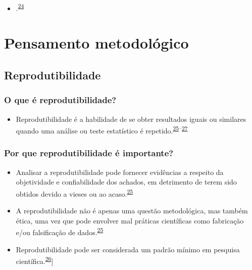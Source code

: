 \documentclass[
  a4paper,
]{book}
\providecommand{\tightlist}{%
  \setlength{\itemsep}{0pt}\setlength{\parskip}{0pt}}
\begin{document}
\begin{itemize}
\tightlist
\item
  .\textsuperscript{\protect\hyperlink{ref-feld1991}{24}}
\end{itemize}

\hypertarget{pensamento-metodologico}{%
\chapter{\texorpdfstring{\textbf{Pensamento metodológico}}{Pensamento metodológico}}\label{pensamento-metodologico}}

\hypertarget{reprodutibilidade}{%
\section{Reprodutibilidade}\label{reprodutibilidade}}

\hypertarget{o-que-uxe9-reprodutibilidade}{%
\subsection{O que é reprodutibilidade?}\label{o-que-uxe9-reprodutibilidade}}

\begin{itemize}
\tightlist
\item
  Reprodutibilidade é a habilidade de se obter resultados iguais ou similares quando uma análise ou teste estatístico é repetido.\textsuperscript{\protect\hyperlink{ref-resnik2016}{25}--\protect\hyperlink{ref-mair2016}{27}}
\end{itemize}

\hypertarget{por-que-reprodutibilidade-uxe9-importante}{%
\subsection{Por que reprodutibilidade é importante?}\label{por-que-reprodutibilidade-uxe9-importante}}

\begin{itemize}
\item
  Analisar a reprodutibilidade pode fornecer evidências a respeito da objetividade e confiabilidade dos achados, em detrimento de terem sido obtidos devido a vieses ou ao acaso.\textsuperscript{\protect\hyperlink{ref-resnik2016}{25}}
\item
  A reprodutibilidade não é apenas uma questão metodológica, mas também ética, uma vez que pode envolver mal práticas científicas como fabricação e/ou falsificação de dados.\textsuperscript{\protect\hyperlink{ref-resnik2016}{25}}
\item
  Reprodutibilidade pode ser considerada um padrão mínimo em pesquisa científica.\textsuperscript{\protect\hyperlink{ref-hofner2015}{26}}{]}
\end{itemize}
\end{document}
